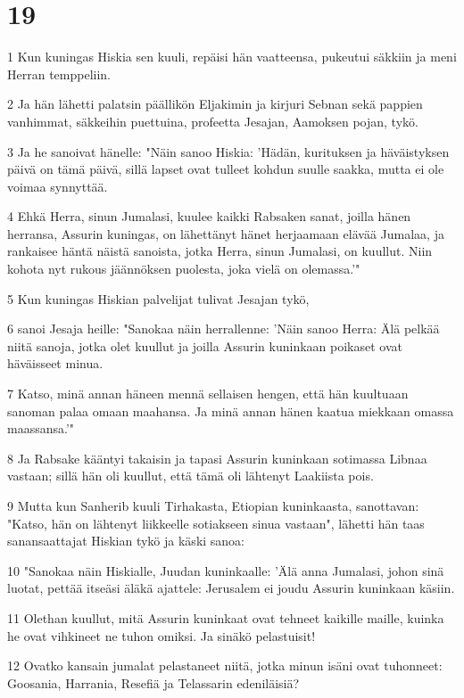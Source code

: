 \chapter{19}

\par 1 Kun kuningas Hiskia sen kuuli, repäisi hän vaatteensa, pukeutui säkkiin ja meni Herran temppeliin.
\par 2 Ja hän lähetti palatsin päällikön Eljakimin ja kirjuri Sebnan sekä pappien vanhimmat, säkkeihin puettuina, profeetta Jesajan, Aamoksen pojan, tykö.
\par 3 Ja he sanoivat hänelle: "Näin sanoo Hiskia: 'Hädän, kurituksen ja häväistyksen päivä on tämä päivä, sillä lapset ovat tulleet kohdun suulle saakka, mutta ei ole voimaa synnyttää.
\par 4 Ehkä Herra, sinun Jumalasi, kuulee kaikki Rabsaken sanat, joilla hänen herransa, Assurin kuningas, on lähettänyt hänet herjaamaan elävää Jumalaa, ja rankaisee häntä näistä sanoista, jotka Herra, sinun Jumalasi, on kuullut. Niin kohota nyt rukous jäännöksen puolesta, joka vielä on olemassa.'"
\par 5 Kun kuningas Hiskian palvelijat tulivat Jesajan tykö,
\par 6 sanoi Jesaja heille: "Sanokaa näin herrallenne: 'Näin sanoo Herra: Älä pelkää niitä sanoja, jotka olet kuullut ja joilla Assurin kuninkaan poikaset ovat häväisseet minua.
\par 7 Katso, minä annan häneen mennä sellaisen hengen, että hän kuultuaan sanoman palaa omaan maahansa. Ja minä annan hänen kaatua miekkaan omassa maassansa.'"
\par 8 Ja Rabsake kääntyi takaisin ja tapasi Assurin kuninkaan sotimassa Libnaa vastaan; sillä hän oli kuullut, että tämä oli lähtenyt Laakiista pois.
\par 9 Mutta kun Sanherib kuuli Tirhakasta, Etiopian kuninkaasta, sanottavan: "Katso, hän on lähtenyt liikkeelle sotiakseen sinua vastaan", lähetti hän taas sanansaattajat Hiskian tykö ja käski sanoa:
\par 10 "Sanokaa näin Hiskialle, Juudan kuninkaalle: 'Älä anna Jumalasi, johon sinä luotat, pettää itseäsi äläkä ajattele: Jerusalem ei joudu Assurin kuninkaan käsiin.
\par 11 Olethan kuullut, mitä Assurin kuninkaat ovat tehneet kaikille maille, kuinka he ovat vihkineet ne tuhon omiksi. Ja sinäkö pelastuisit!
\par 12 Ovatko kansain jumalat pelastaneet niitä, jotka minun isäni ovat tuhonneet: Goosania, Harrania, Resefiä ja Telassarin edeniläisiä?
